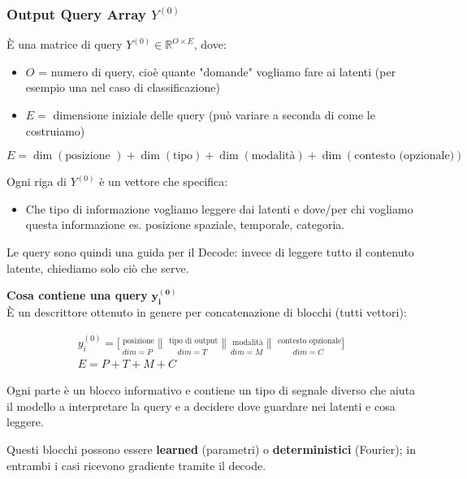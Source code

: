 \documentclass[
  11pt,
]{article}
\begin{document}
\subsubsection{Output Query Array $Y^{(0)}$}
\label{subsec:output-query-array}

È una matrice di query \(Y^{(0)} \in \mathbb{R}^{O \times E}\), dove:

\begin{itemize}
\item
  \(O\) = numero di query, cioè quante "domande" vogliamo fare ai
  latenti (per esempio una nel caso di classificazione)
\item
  \(E =\) dimensione iniziale delle query (può variare a seconda di come
  le costruiamo)
\end{itemize}


\[E = \dim(\text{posizione }) + \dim(\text{tipo}) + \dim(\text{modalità}) + \dim(\text{contesto (opzionale)})\]


Ogni riga di \(Y^{(0)}\) è un vettore che specifica:

\begin{itemize}
\item
  Che tipo di informazione vogliamo leggere dai latenti e dove/per chi
  vogliamo questa informazione es. posizione spaziale, temporale,
  categoria.
\end{itemize}

Le query sono quindi una guida per il Decode: invece di leggere tutto il
contenuto latente, chiediamo solo ciò che serve.

\textbf{Cosa contiene una query}
\(\mathbf{y}_{\mathbf{i}}^{\mathbf{(0)}}\)\\
È un descrittore ottenuto in genere per concatenazione di blocchi (tutti
vettori):

\[\begin{matrix}
y_{i}^{(0)} = \lbrack\underset{dim = P}{\overset{\text{ posizione}}{}}\|\underset{dim = T}{\overset{\text{ tipo di output}}{}}\|\underset{dim = M}{\overset{\text{ modalità}}{}}\|\underset{dim = C}{\overset{\text{ contesto opzionale}}{}}\rbrack \\
E = P + T + M + C
\end{matrix}\]

Ogni parte è un blocco informativo e contiene un tipo di segnale diverso
che aiuta il modello a interpretare la query e a decidere dove guardare
nei latenti e cosa leggere.

Questi blocchi possono essere \textbf{learned} (parametri) o
\textbf{deterministici} (Fourier); in entrambi i casi ricevono gradiente
tramite il decode.
\end{document}
